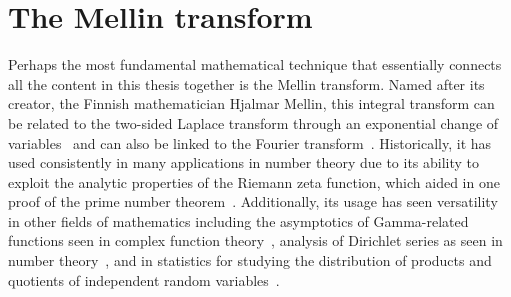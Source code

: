\section{The Mellin transform}
		Perhaps the most fundamental mathematical technique that essentially connects all the content in this thesis together is the Mellin transform. Named after its creator, the Finnish mathematician Hjalmar Mellin, this integral transform can be related to the two-sided Laplace transform through an exponential change of variables~\cite{Bracewell2000} and can also be linked to the Fourier transform~\cite{Cohen2008}. Historically, it has used consistently in many applications in number theory due to its ability to exploit the analytic properties of the Riemann zeta function, which aided in one proof of the prime number theorem~\cite[pp. 51--54]{Titchmarsh1986}. Additionally, its usage has seen versatility in other fields of mathematics including the asymptotics of Gamma-related functions seen in complex function theory~\cite{Mellin1904}, analysis of Dirichlet series as seen in number theory~\cite{Friedberg2006, Montgomery2007}, and in statistics for studying the distribution of products and quotients of independent random variables~\cite{Epstein1948}.
